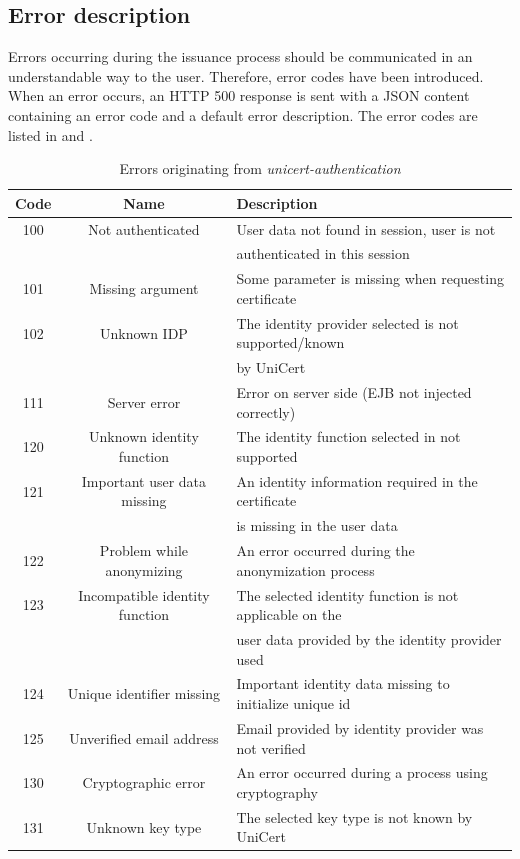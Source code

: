 \documentclass[oneside]{scrreprt}
\newcommand{\unicert}{\mbox{UniCert}}
\begin{document}
\subsection{Error description}

Errors occurring during the issuance process should be communicated in an understandable way to the user. Therefore, error codes have been introduced. When an error occurs, an HTTP 500 response is sent with a JSON content containing an error code and a default error description. The error codes are listed in  and .

\begin{table}[ht]
\centering
\begin{tabular}{|c|c|l|}
  \hline
  Code & Name & Description\\
  \hline
  100 & Not authenticated & User data not found in session, user is not\\ &&  authenticated in this session\\
  101 & Missing argument & Some parameter is missing when requesting certificate \\
  102 & Unknown IDP & The identity provider selected is not supported/known\\ &&  by \unicert\\
  111 & Server error &  Error on server side (EJB not injected correctly)\\
  120 & Unknown identity function & The identity function selected in not supported \\
  121 & Important user data missing & An identity information required in the certificate\\ &&  is missing in the user data\\
  122 & Problem while anonymizing & An error occurred during the anonymization process\\
  123 & Incompatible identity function & The selected identity function is not applicable on the\\ &&   user data provided by the identity provider used\\
  124 & Unique identifier missing & Important identity data missing to initialize unique id\\
  125 & Unverified email address & Email provided by identity provider was not verified\\
  130 & Cryptographic error & An error occurred during a process using cryptography\\
  131 & Unknown key type & The selected key type is not known by \unicert\\
  \hline
\end{tabular}
\caption{Errors originating from \textit{unicert-authentication}}
\label{t:errorCodes1}
\end{table}
\end{document}
